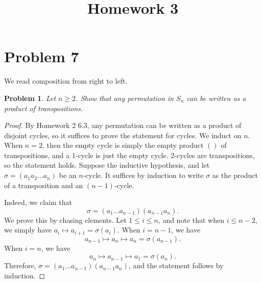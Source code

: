 \documentclass[11pt, letterpaper]{article}
\title{Homework 3}
\theoremstyle{plain}
\newtheorem{problem}{Problem}[section]
\begin{document}
\makeproblem


\setcounter{section}{6}

\section{Problem 7}

\begin{convention}
	We read composition from right to left.
\end{convention}

\begin{problem}
	Let $n\geq 2$. Show that any permutation in $S_n$ can be written as a product of transpositions.
\end{problem}
\begin{proof}
	By Homework 2 6.3, any permutation can be written as a product of disjoint cycles, so it suffices to prove the statement for cycles. We induct on $n$. When $n=2$, then the empty cycle is simply the empty product $( )$ of transpositions, and a 1-cycle is just the empty cycle. 2-cycles are transpositions, so the statement holds. Suppose the inductive hypothesis, and let $\sigma =(a_1a_2 \ldots a_n)$ be an $n$-cycle. It suffices by induction to write $\sigma $ as the product of a transposition and an $(n-1)$-cycle.

	Indeed, we claim that
	\[
		\sigma =(a_1 \ldots a_{n-1} )(a_{n-1} a_n)
	.\]
	We prove this by chasing elements. Let $1\leq i\leq n$, and note that when $i\leq n-2$, we simply have $a_i \mapsto a_{i+1} =\sigma (a_i)$. When $i=n-1$, we have
	\[
		a_{n-1} \mapsto a_n \mapsto a_n = \sigma (a_{n-1} )
	.\]
	When $i=n$, we have
	\[
		a_n \mapsto a_{n-1} \mapsto a_1 = \sigma (a_n)
	.\]
	Therefore, $\sigma =(a_1\ldots a_{n-1} )(a_{n-1} a_n)$, and the statement follows by induction.
\end{proof}
\end{document}
